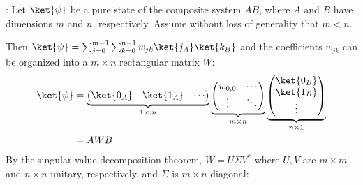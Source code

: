 \par {}: Let $\ket{\psi}$ be a pure state of the composite system $AB$, where $A$ and $B$ have dimensions $m$ and $n$, respectively.
%
Assume without loss of generality that $m < n$.
%
\par Then $\ket{\psi} = \sum_{j = 0}^{m - 1}{\sum_{k = 0}^{n - 1}{w_{jk} \ket{j_A}
\ket{k_B}}}$ and the coefficients $w_{jk}$ can be organized into a $m \times n$ rectangular matrix $W$:
%
\begin{align}
\ket{\psi} &=
\underbrace{\begin{pmatrix} \ket{0_A} & \ket{1_A} & \cdots \end{pmatrix}}_{1 \times m}
\underbrace{\begin{pmatrix} w_{0, 0} & \cdots \\ \vdots & \ddots \end{pmatrix}}_{m \times n}
\underbrace{\begin{pmatrix} \ket{0_B} \\ \ket{1_B} \\ \vdots \end{pmatrix}}_{n \times 1} \\
&= A W B
\end{align}
%
By the singular value decomposition theorem, $W = U \Sigma V^*$ where $U, V$ are $m \times m$ and $n \times n$ unitary, respectively, and $\Sigma$ is $m \times n$ diagonal:
%
